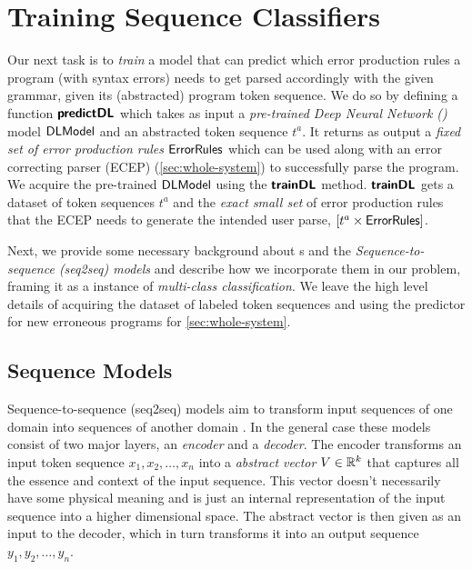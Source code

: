 \section{Training Sequence Classifiers}
\label{sec:seq-classifiers}

Our next task is to \emph{train} a model that can predict which error production
rules a program (with syntax errors) needs to get parsed accordingly with the
given grammar, given its (abstracted) program token sequence.
%
We do so by defining a function $\bm{\mathsf{predictDL}}$ which takes as input a
\emph{pre-trained Deep Neural Network (\dnn)} model $\mathsf{DLModel}$ and an abstracted
token sequence $t^a$.
%
It returns as output a \emph{fixed set of error production rules}
$\mathsf{ErrorRules}$ which can be used along with an error correcting parser (ECEP)
(\autoref{sec:whole-system}) to successfully parse the program.
%
We acquire the pre-trained $\mathsf{DLModel}$ using the $\bm{\mathsf{trainDL}}$ method.
$\bm{\mathsf{trainDL}}$ gets a dataset of token sequences $t^a$ and the \emph{exact small
set} of error production rules that the ECEP needs to generate the intended user
parse, \ie $[t^a \times \mathsf{ErrorRules}]$.

Next, we provide some necessary background about \dnn{}s and the
\emph{Sequence-to-sequence (seq2seq) models} and describe how we incorporate
them in our problem, framing it as a instance of \emph{multi-class
classification}. We leave the high level details of acquiring the dataset of
labeled token sequences and using the predictor for new erroneous programs for
\autoref{sec:whole-system}.


\subsection{Sequence Models}
\label{sec:seq-classifiers:seq-models}

Sequence-to-sequence (seq2seq) models aim to transform input sequences of one
domain into sequences of another domain \citep{Sutskever_2014}. In the general
case these models consist of two major layers, an \emph{encoder} and a
\emph{decoder}. The encoder transforms an input token sequence $x_1, x_2, \dots,
x_n$ into a \emph{abstract vector} $V \in \mathbb{R}^k$ that captures all the essence
and context of the input sequence. This vector doesn't necessarily have some
physical meaning and is just an internal representation of the input sequence
into a higher dimensional space. The abstract vector is then given as an input
to the decoder, which in turn transforms it into an output sequence $y_1, y_2,
\dots, y_n$.

